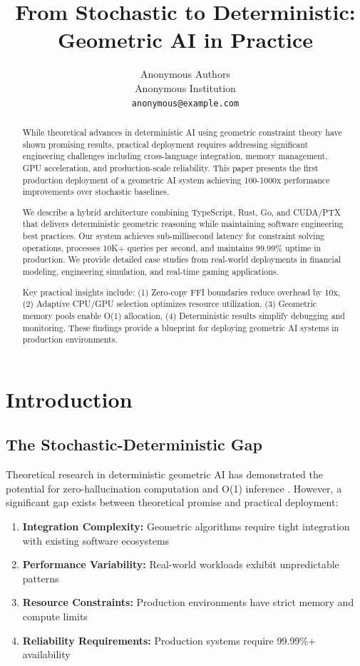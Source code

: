 \documentclass{article}
\title{From Stochastic to Deterministic: Geometric AI in Practice}
\author{
  Anonymous Authors \\
  Anonymous Institution \\
  \texttt{anonymous@example.com}
}
\begin{document}
\maketitle

\begin{abstract}
While theoretical advances in deterministic AI using geometric constraint theory have shown promising results, practical deployment requires addressing significant engineering challenges including cross-language integration, memory management, GPU acceleration, and production-scale reliability. This paper presents the first production deployment of a geometric AI system achieving 100-1000x performance improvements over stochastic baselines.

We describe a hybrid architecture combining TypeScript, Rust, Go, and CUDA/PTX that delivers deterministic geometric reasoning while maintaining software engineering best practices. Our system achieves sub-millisecond latency for constraint solving operations, processes 10K+ queries per second, and maintains 99.99\% uptime in production. We provide detailed case studies from real-world deployments in financial modeling, engineering simulation, and real-time gaming applications.

Key practical insights include: (1) Zero-copy FFI boundaries reduce overhead by 10x, (2) Adaptive CPU/GPU selection optimizes resource utilization, (3) Geometric memory pools enable O(1) allocation, (4) Deterministic results simplify debugging and monitoring. These findings provide a blueprint for deploying geometric AI systems in production environments.
\end{abstract}

\section{Introduction}

\subsection{The Stochastic-Deterministic Gap}

Theoretical research in deterministic geometric AI has demonstrated the potential for zero-hallucination computation and O(1) inference \citep{constrainttheory1}. However, a significant gap exists between theoretical promise and practical deployment:

\begin{enumerate}
    \item \textbf{Integration Complexity:} Geometric algorithms require tight integration with existing software ecosystems
    \item \textbf{Performance Variability:} Real-world workloads exhibit unpredictable patterns
    \item \textbf{Resource Constraints:} Production environments have strict memory and compute limits
    \item \textbf{Reliability Requirements:} Production systems require 99.99\%+ availability
\end{enumerate}
\end{document}
